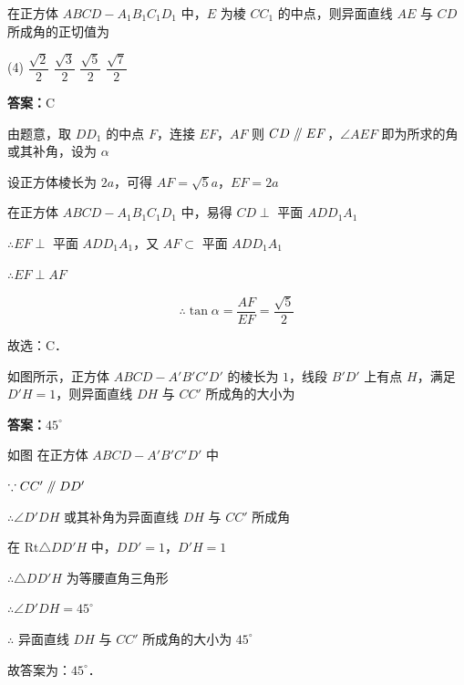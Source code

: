 \begin{example}[\bkstar{2}{5}]
在正方体 $ABCD-A_1B_1C_1D_1$ 中，$E$ 为棱 $CC_1$ 的中点，则异面直线 $AE$ 与 $CD$ 所成角的正切值为
\begin{tasks}(4)
    \task $\dfrac{\sqrt{2}}{2}$
    \task $\dfrac{\sqrt{3}}{2}$
    \task $\dfrac{\sqrt{5}}{2}$
    \task $\dfrac{\sqrt{7}}{2}$
\end{tasks}
\end{example}
\begin{solution}
\textbf{答案：}C

由题意，取 $DD_1$ 的中点 $F$，连接 $EF$，$AF$
则 $CD\mathrel{/\mkern-5mu/} EF$，$\angle AEF$ 即为所求的角或其补角，设为 $\alpha$

设正方体棱长为 $2a$，可得 $AF=\sqrt{5}a$，$EF=2a$

在正方体 $ABCD-A_1B_1C_1D_1$ 中，易得 $CD\perp$ 平面 $ADD_1A_1$

$\therefore EF\perp$ 平面 $ADD_1A_1$，又 $AF\subset$ 平面 $ADD_1A_1$

$\therefore EF\perp AF$

$$
\therefore \tan\alpha=\dfrac{AF}{EF}=\dfrac{\sqrt{5}}{2}
$$

故选：C．
\end{solution}

\vspace{2em}

\begin{example}[\bkstar{2}{5}]
如图所示，正方体 $ABCD-A'B'C'D'$ 的棱长为 $1$，线段 $B'D'$ 上有点 $H$，满足 $D'H=1$，则异面直线 $DH$ 与 $CC'$ 所成角的大小为
\end{example}
\begin{solution}
\textbf{答案：}$45^{\circ}$

如图
在正方体 $ABCD-A'B'C'D'$ 中

$\because CC'\mathrel{/\mkern-5mu/} DD'$

$\therefore \angle D'DH$ 或其补角为异面直线 $DH$ 与 $CC'$ 所成角

在 $\mathrm{Rt}\triangle DD'H$ 中，$DD'=1$，$D'H=1$

$\therefore \triangle DD'H$ 为等腰直角三角形

$\therefore \angle D'DH=45^{\circ}$

$\therefore$ 异面直线 $DH$ 与 $CC'$ 所成角的大小为 $45^{\circ}$

故答案为：$45^{\circ}$．
\end{solution}

